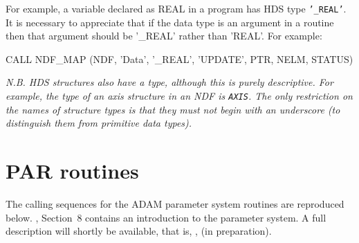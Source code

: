 \documentclass[twoside,11pt,nolof]{starlink}
\begin{document}
For example, a variable declared as REAL in a program has HDS type
\texttt{'\_REAL'}.
It is necessary to appreciate that if the data type is
an argument in a
routine then that  argument should be '\_REAL' rather than 'REAL'.
For example:
\begin{terminalv}
      CALL NDF_MAP (NDF, 'Data', '_REAL', 'UPDATE', PTR, NELM, STATUS)
\end{terminalv}

\textsl{N.B. HDS structures also have a type, although this is purely descriptive.
For example, the type of an axis  structure in an NDF is \texttt{AXIS}.
The only restriction on the names of structure types is that they
must not begin with an underscore (to distinguish them from
primitive data types).}

\newpage
\section{PAR routines\label{apxpar}}

The calling sequences for the ADAM  parameter system routines are
reproduced below. , Section~8  contains an introduction to
the parameter system.
A full description will shortly be available, that is,
, (in preparation).
\end{document}
